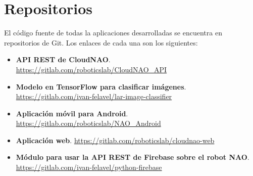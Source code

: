 \section*{Repositorios}

El código fuente de todas la aplicaciones desarrolladas se encuentra
en repositorios de Git. Los enlaces de cada una son los siguientes:

\begin{itemize}
\item \textbf{API REST de CloudNAO}. 
\url{https://gitlab.com/roboticslab/CloudNAO_API}

\item \textbf{Modelo en TensorFlow para clasificar imágenes}.
\url{https://gitlab.com/ivan-felavel/lar-image-classifier}

\item \textbf{Aplicación móvil para Android}.
\url{https://gitlab.com/roboticslab/NAO_Android}

\item \textbf{Aplicación web}.
\url{https://gitlab.com/roboticslab/cloudnao-web}

\item \textbf{Módulo para usar la API REST de Firebase sobre el robot NAO}.
\url{https://gitlab.com/ivan-felavel/python-firebase}

\end{itemize}